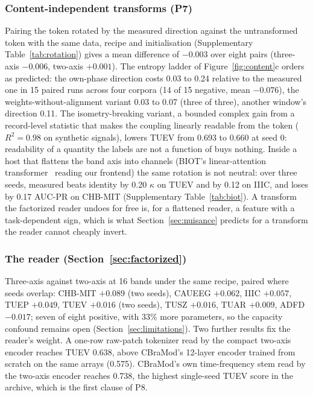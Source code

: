 \subsubsection{Content-independent transforms (P7)}
\label{sec:rotation}
Pairing the token rotated by the measured direction against the untransformed token with the same data, recipe and initialisation (Supplementary Table~\ref{tab:rotation}) gives a mean difference of $-0.003$ over eight pairs (three-axis $-0.006$, two-axis $+0.001$). The entropy ladder of Figure~\ref{fig:content}c orders as predicted: the own-phase direction costs 0.03 to 0.24 relative to the measured one in 15 paired runs across four corpora (14 of 15 negative, mean $-0.076$), the weights-without-alignment variant 0.03 to 0.07 (three of three), another window's direction 0.11. The isometry-breaking variant, a bounded complex gain from a record-level statistic that makes the coupling linearly readable from the token ($R^2 = 0.98$ on synthetic signals), lowers TUEV from 0.693 to 0.660 at seed 0: readability of a quantity the labels are not a function of buys nothing. Inside a host that flattens the band axis into channels (BIOT's linear-attention transformer~\cite{yang2023biot} reading our frontend) the same rotation is not neutral: over three seeds, measured beats identity by 0.20 $\kappa$ on TUEV and by 0.12 on IIIC, and loses by 0.17 AUC-PR on CHB-MIT (Supplementary Table~\ref{tab:biot}). A transform the factorized reader undoes for free is, for a flattened reader, a feature with a task-dependent sign, which is what Section~\ref{sec:nuisance} predicts for a transform the reader cannot cheaply invert.

\subsubsection{The reader (Section~\ref{sec:factorized})}
\label{sec:reader}
Three-axis against two-axis at 16 bands under the same recipe, paired where seeds overlap: CHB-MIT $+0.089$ (two seeds), CAUEEG $+0.062$, IIIC $+0.057$, TUEP $+0.049$, TUEV $+0.016$ (two seeds), TUSZ $+0.016$, TUAR $+0.009$, ADFD $-0.017$; seven of eight positive, with 33\% more parameters, so the capacity confound remains open (Section~\ref{sec:limitations}). Two further results fix the reader's weight. A one-row raw-patch tokenizer read by the compact two-axis encoder reaches TUEV 0.638, above CBraMod's 12-layer encoder trained from scratch on the same arrays (0.575). CBraMod's own time-frequency stem read by the two-axis encoder reaches 0.738, the highest single-seed TUEV score in the archive, which is the first clause of P8.

